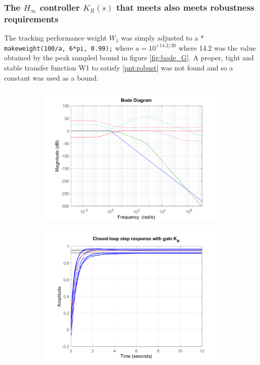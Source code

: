\documentclass{article}
\begin{document}
\subsubsection{The $H_\infty$ controller $K_R(s)$ that meets also meets robustness requirements}

The tracking performance weight $W_1$ was simply adjusted to a * \texttt{makeweight(100/a, 6*pi, 0.99);} where $a = 10^{+14.2/20}$ where 14.2 was the value obtained by the peak sampled bound in figure \ref{fig:bode_G}.
A proper, tight and stable transfer function W1 to satisfy \ref{pnt:robust} was not found and so a constant was used as a bound.


\begin{figure}[H]
    \centering
    \begin{subfigure}{0.45\textwidth}
        \centering
        \includegraphics[width=\textwidth]{figures/K_R_bode.png}
        \caption{}
        \label{fig:K_g_bode}
    \end{subfigure}
    \begin{subfigure}{0.45\textwidth}
        \centering
        \includegraphics[width=\textwidth]{figures/K_R_step.png}
        \caption{}
        \label{fig:K_g_step}
    \end{subfigure}
    \caption{}
\end{figure}
\end{document}
